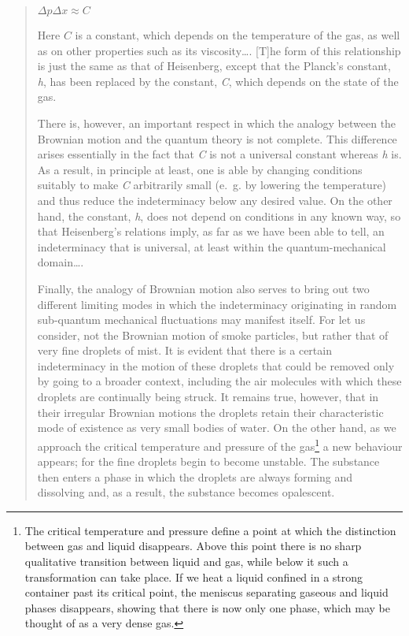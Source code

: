 \documentclass[11pt]{memoir}
\begin{document}
\begin{quote}
$\Delta p\Delta x \approx C$

Here $C$ is a constant, which depends on the temperature of the
gas, as well as on other properties such as its viscosity\ldots.
{[}T{]}he form of this relationship is just the same as that of
Heisenberg, except that the Planck's constant, \emph{h}, has been
replaced by the constant, \emph{C}, which depends on the state of the
gas.

There is, however, an important respect in which the analogy between the
Brownian motion and the quantum theory is not complete. This difference
arises essentially in the fact that \emph{C} is not a universal constant
whereas \emph{h} is. As a result, in principle at least, one is able by
changing conditions suitably to make \emph{C} arbitrarily small (e.~g.
by lowering the temperature) and thus reduce the indeterminacy below any
desired value. On the other hand, the constant, \emph{h}, does not
depend on conditions in any known way, so that Heisenberg's relations
imply, as far as we have been able to tell, an indeterminacy that is
universal, at least within the quantum-mechanical domain\ldots.

Finally, the analogy of Brownian motion also serves to bring out two
different limiting modes in which the indeterminacy originating in
random sub-quantum mechanical fluctuations may manifest itself. For let
us consider, not the Brownian motion of smoke particles, but rather that
of very fine droplets of mist. It is evident that there is a certain
indeterminacy in the motion of these droplets that could be removed only
by going to a broader context, including the air molecules with which
these droplets are continually being struck. It remains true, however,
that in their irregular Brownian motions the droplets retain their
characteristic mode of existence as very small bodies of water. On the
other hand, as we approach the critical temperature and pressure of the
gas\footnote{The critical temperature and pressure define a point at
  which the distinction between gas and liquid disappears. Above this
  point there is no sharp qualitative transition between liquid and gas,
  while below it such a transformation can take place. If we heat a
  liquid confined in a strong container past its critical point, the
  meniscus separating gaseous and liquid phases disappears, showing that
  there is now only one phase, which may be thought of as a very dense
  gas.} a new behaviour appears; for the fine droplets begin to become
unstable. The substance then enters a phase in which the droplets are
always forming and dissolving and, as a result, the substance becomes
opalescent.


\end{quote}
\end{document}
